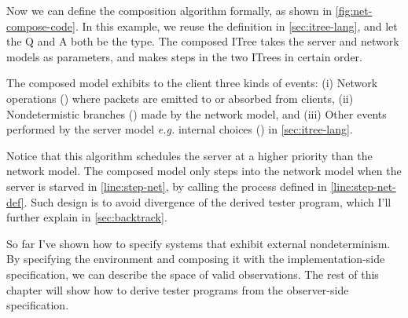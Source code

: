 Now we can define the composition algorithm formally, as shown in
\autoref{fig:net-compose-code}.  In this example, we reuse the 
definition in \autoref{sec:itree-lang}, and let the \ilc Q and \ilc A both be
the  type.  The composed ITree takes the server and network models
as parameters, and makes steps in the two ITrees in certain order.

The composed model exhibits to the client three kinds of events: (i) Network
operations () where packets are emitted to or absorbed from clients,
(ii) Nondetermistic branches () made by the network model, and
(iii) Other events  performed by the server model {\it e.g.} internal
choices () in \autoref{sec:itree-lang}.

Notice that this algorithm schedules the server at a higher priority than the
network model.  The composed model only steps into the network model when the
server is starved in \autoref{line:step-net}, by calling the 
process defined in \autoref{line:step-net-def}.  Such design is to avoid
divergence of the derived tester program, which I'll further explain in
\autoref{sec:backtrack}.

So far I've shown how to specify systems that exhibit external nondeterminism.
By specifying the environment and composing it with the implementation-side
specification, we can describe the space of valid observations.  The rest of
this chapter will show how to derive tester programs from the observer-side
specification.
